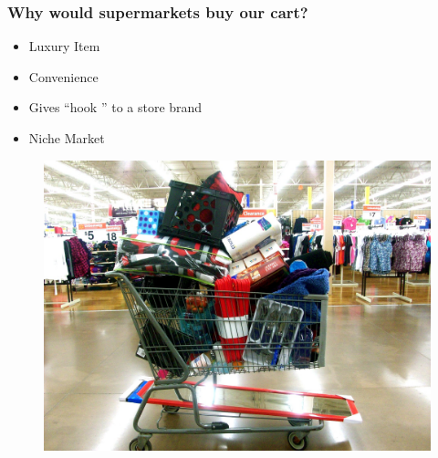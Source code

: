 \documentclass[12pt]{beamer}
\begin{document}
\begin{frame}


  \frametitle{Why would supermarkets buy our cart? }
 \vspace{-2.0cm}
	\begin{itemize}
	
      \item Luxury Item 
      \item Convenience 
      \item Gives “hook ” to a store brand 
      \item Niche Market
    \end{itemize}
    
\begin{figure}
                \includegraphics[scale=.05]{images/unorgCart.jpg}
                
            \end{figure}    
    
\end{frame}
\end{document}
